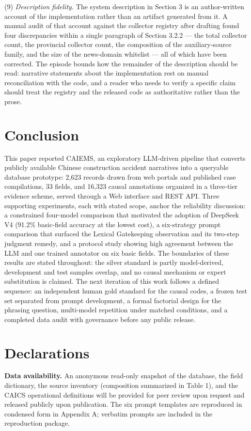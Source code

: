 \documentclass[11pt]{article}
\begin{document}
(9) \textit{Description fidelity.} The system description in Section 3 is an author-written account of the implementation rather than an artifact generated from it. A manual audit of that account against the collector registry after drafting found four discrepancies within a single paragraph of Section 3.2.2 --- the total collector count, the provincial collector count, the composition of the auxiliary-source family, and the size of the news-domain whitelist --- all of which have been corrected. The episode bounds how the remainder of the description should be read: narrative statements about the implementation rest on manual reconciliation with the code, and a reader who needs to verify a specific claim should treat the registry and the released code as authoritative rather than the prose.

\section{Conclusion}
This paper reported CAIEMS, an exploratory LLM-driven pipeline that converts publicly available Chinese construction accident narratives into a queryable database prototype: 2,623 records drawn from web portals and published case compilations, 33 fields, and 16,323 causal annotations organized in a three-tier evidence scheme, served through a Web interface and REST API. Three supporting experiments, each with stated scope, anchor the reliability discussion: a constrained four-model comparison that motivated the adoption of DeepSeek V4 (91.2\% basic-field accuracy at the lowest cost), a six-strategy prompt comparison that surfaced the Lexical Gatekeeping observation and its two-step judgment remedy, and a protocol study showing high agreement between the LLM and one trained annotator on six basic fields. The boundaries of these results are stated throughout: the silver standard is partly model-derived, development and test samples overlap, and no causal mechanism or expert substitution is claimed. The next iteration of this work follows a defined sequence: an independent human gold standard for the causal codes, a frozen test set separated from prompt development, a formal factorial design for the phrasing question, multi-model repetition under matched conditions, and a completed data audit with governance before any public release.

\section{Declarations}
\textbf{Data availability.} An anonymous read-only snapshot of the database, the field dictionary, the source inventory (composition summarized in Table 1), and the CAICS operational definitions will be provided for peer review upon request and released publicly upon publication. The six prompt templates are reproduced in condensed form in Appendix A; verbatim prompts are included in the reproduction package.
\end{document}
